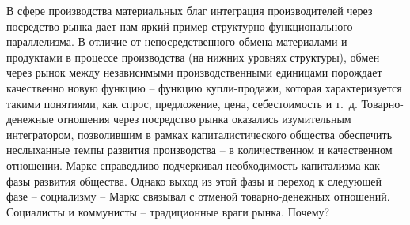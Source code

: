 \documentclass{book}
\begin{document}
В сфере производства материальных благ интеграция произ­водителей через посредство рынка  дает нам яркий пример струк­турно-функционального параллелизма. В отличие от непосред­ственного обмена материалами и продуктами в процессе производства (на нижних уровнях структуры), обмен через рынок между независимыми производственными единицами порож­дает качественно новую функцию -- функцию купли-продажи, которая характеризуется такими понятиями, как спрос, предло­жение, цена, себестоимость и т.~д. Товарно-денежные отношения через посредство рынка оказались изумительным интегратором, позволившим в рамках капиталистического общества обеспе­чить неслыханные темпы развития производства -- в количест­венном и качественном отношении. Маркс справедливо под­черкивал необходимость капитализма как фазы развития об­щества. Однако выход из этой фазы и переход к следующей фазе -- социализму -- Маркс связывал с отменой товарно-де­нежных отношений. Социалисты и коммунисты -- традицион­ные враги рынка. Почему?
\end{document}
